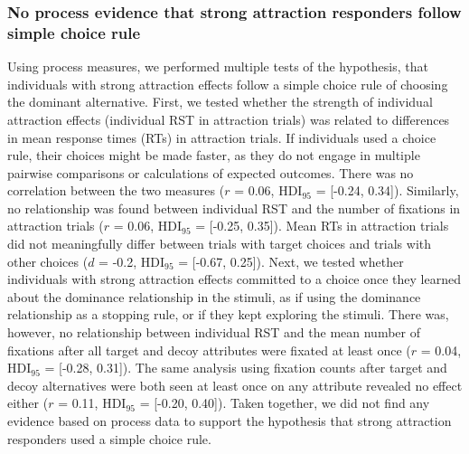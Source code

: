 \documentclass[11pt, a4paper]{article}
\begin{document}
\begin{refsection}
\subsubsection*{No process evidence that strong attraction responders follow simple choice rule}
Using process measures, we performed multiple tests of the hypothesis, that individuals with strong attraction effects follow a simple choice rule of choosing the dominant alternative. First, we tested whether the strength of individual attraction effects (individual RST in attraction trials) was related to differences in mean response times (RTs) in attraction trials. If individuals used a choice rule, their choices might be made faster, as they do not engage in multiple pairwise comparisons or calculations of expected outcomes. There was no correlation between the two measures ($r$ = 0.06, HDI$_{95}$ = [-0.24, 0.34]). Similarly, no relationship was found between individual RST and the number of fixations in attraction trials ($r$ = 0.06, HDI$_{95}$ = [-0.25, 0.35]). Mean RTs in attraction trials did not meaningfully differ between trials with target choices and trials with other choices ($d$ = -0.2, HDI$_{95}$ = [-0.67, 0.25]). Next, we tested whether individuals with strong attraction effects committed to a choice once they learned about the dominance relationship in the stimuli, as if using the dominance relationship as a stopping rule, or if they kept exploring the stimuli. There was, however, no relationship between individual RST and the mean number of fixations after all target and decoy attributes were fixated at least once ($r$ = 0.04, HDI$_{95}$ = [-0.28, 0.31]). The same analysis using fixation counts after target and decoy alternatives were both seen at least once on any attribute revealed no effect either ($r$ = 0.11, HDI$_{95}$ = [-0.20, 0.40]).
Taken together, we did not find any evidence based on process data to support the hypothesis that strong attraction responders used a simple choice rule.

\renewcommand*{\bibfont}{\small}
\printbibliography[title=Supplementary Information References]

\end{refsection} %
\end{document}
